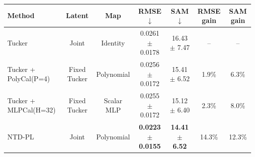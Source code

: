 \begin{tabular}{@{}l c c c c c c@{}}
\toprule
Method & Latent & Map & RMSE$\downarrow$ & SAM$\downarrow$ & RMSE gain & SAM gain \\
\midrule
Tucker & Joint & Identity & 0.0261 $\pm$ 0.0178 & 16.43 $\pm$ 7.47 & -- & -- \\
Tucker + PolyCal(P=4) & Fixed Tucker & Polynomial & 0.0256 $\pm$ 0.0172 & 15.41 $\pm$ 6.52 & 1.9\% & 6.3\% \\
Tucker + MLPCal(H=32) & Fixed Tucker & Scalar MLP & 0.0255 $\pm$ 0.0172 & 15.12 $\pm$ 6.40 & 2.3\% & 8.0\% \\
NTD-PL & Joint & Polynomial & \textbf{0.0223 $\pm$ 0.0155} & \textbf{14.41 $\pm$ 6.52} & 14.3\% & 12.3\% \\
\bottomrule
\end{tabular}
